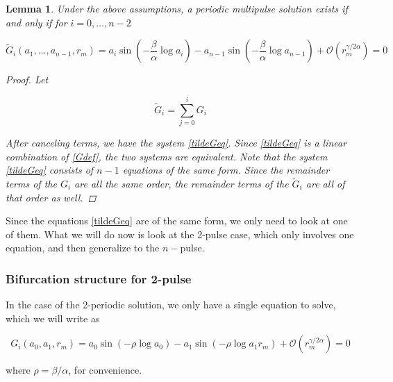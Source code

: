 \documentclass[12pt]{article}
\newtheorem{lemma}{Lemma}
\begin{document}

\begin{lemma}\label{diagonalG}
Under the above assumptions, a periodic multipulse solution exists if and only if for $i = 0, \dots, n-2$

\begin{equation}\label{tildeGeq}
\tilde{G}_i(a_1, \dots, a_{n-1}, r_m) = a_i \sin \left( - \frac{\beta}{\alpha} \log a_i \right) - a_{n-1} \sin \left( - \frac{\beta}{\alpha} \log a_{n-1} \right) + \mathcal{O}(r_m^{\gamma / 2 \alpha}) = 0
\end{equation}

\begin{proof}

Let 

\begin{equation}\label{tildeGdef}
\tilde{G}_i = \sum_{j = 0}^i G_i
\end{equation}

After canceling terms, we have the system \eqref{tildeGeq}. Since \eqref{tildeGeq} is a linear combination of \eqref{Gdef}, the two systems are equivalent. Note that the system \eqref{tildeGeq} consists of $n-1$ equations of the same form. Since the remainder terms of the $G_i$ are all the same order, the remainder terms of the $\tilde{G}_i$ are all of that order as well.

\end{proof}
\end{lemma}

Since the equations \eqref{tildeGeq} are of the same form, we only need to look at one of them. What we will do now is look at the 2-pulse case, which only involves one equation, and then generalize to the $n-$pulse.

\subsubsection{Bifurcation structure for 2-pulse}

In the case of the 2-periodic solution, we only have a single equation to solve, which we will write as

\begin{equation}\label{tildeGeq}
G_i(a_0, a_1, r_m) = a_0 \sin \left( -\rho \log a_0 \right) - a_1 \sin \left( -\rho \log a_1 r_m \right) + \mathcal{O}(r_m^{\gamma / 2 \alpha}) = 0
\end{equation}

where  $\rho = \beta / \alpha$, for convenience.\\
\end{document}
